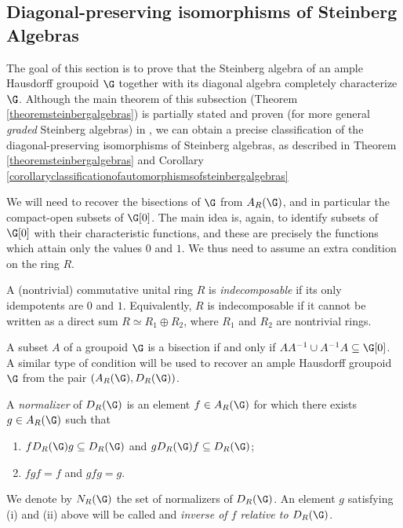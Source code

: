 \subsection{Diagonal-preserving isomorphisms of Steinberg Algebras}

The goal of this section is to prove that the Steinberg algebra of an ample Hausdorff groupoid $\G$ together with its diagonal algebra completely characterize $\G$. Although the main theorem of this subsection (Theorem \ref{theoremsteinbergalgebras}) is partially stated and proven (for more general \emph{graded} Steinberg algebras) in \cite[Corollary 3.14]{carlsenrout2017}, we can obtain a precise classification of the diagonal-preserving isomorphisms of Steinberg algebras, as described in Theorem \ref{theoremsteinbergalgebras} and Corollary \ref{corollaryclassificationofautomorphismsofsteinbergalgebras}

We will need to recover the bisections of $\G$ from $A_R(\G)$, and in particular the compact-open subsets of $\G[0]$. The main idea is, again, to identify subsets of $\G[0]$ with their characteristic functions, and these are precisely the functions which attain only the values $0$ and $1$. We thus need to assume an extra condition on the ring $R$.

\begin{definition}[{\cite[X.7]{MR1878556}}]
A (nontrivial) commutative unital ring $R$ is \emph{indecomposable} if its only idempotents are $0$ and $1$. Equivalently, $R$ is indecomposable if it cannot be written as a direct sum $R\simeq R_1\oplus R_2$, where $R_1$ and $R_2$ are nontrivial rings.
\end{definition}

A subset $A$ of a groupoid $\G$ is a bisection if and only if $AA^{-1}\cup A^{-1}A\subseteq \G[0]$. A similar type of condition will be used to recover an ample Hausdorff groupoid $\G$ from the pair $(A_R(\G),D_R(\G))$.

\begin{definition}
A \emph{normalizer} of $D_R(\G)$ is an element $f\in A_R(\G)$ for which there exists $g\in A_R(\G)$ such that
\begin{enumerate}
\item[(i)] $fD_R(\G)g\subseteq D_R(\G)$ and $gD_R(\G)f\subseteq D_R(\G)$;
\item[(ii)] $fgf=f$ and $gfg=g$.
\end{enumerate}
We denote by $N_R(\G)$ the set of normalizers of $D_R(\G)$. An element $g$ satisfying (i) and (ii) above will be called and \emph{inverse of $f$ relative to $D_R(\G)$}.
\end{definition}

